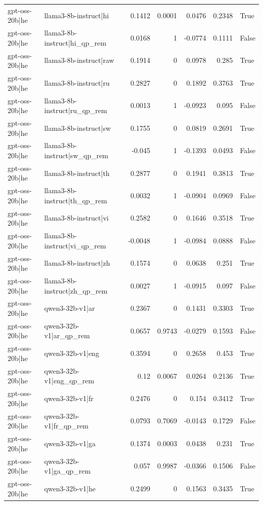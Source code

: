 \begin{table}
\begin{tabular}{l l r r r r l}
gpt-oss-20b|he & llama3-8b-instruct|hi & 0.1412 & 0.0001 & 0.0476 & 0.2348 & True \\
gpt-oss-20b|he & llama3-8b-instruct|hi_qp_rem & 0.0168 & 1 & -0.0774 & 0.1111 & False \\
gpt-oss-20b|he & llama3-8b-instruct|raw & 0.1914 & 0 & 0.0978 & 0.285 & True \\
gpt-oss-20b|he & llama3-8b-instruct|ru & 0.2827 & 0 & 0.1892 & 0.3763 & True \\
gpt-oss-20b|he & llama3-8b-instruct|ru_qp_rem & 0.0013 & 1 & -0.0923 & 0.095 & False \\
gpt-oss-20b|he & llama3-8b-instruct|sw & 0.1755 & 0 & 0.0819 & 0.2691 & True \\
gpt-oss-20b|he & llama3-8b-instruct|sw_qp_rem & -0.045 & 1 & -0.1393 & 0.0493 & False \\
gpt-oss-20b|he & llama3-8b-instruct|th & 0.2877 & 0 & 0.1941 & 0.3813 & True \\
gpt-oss-20b|he & llama3-8b-instruct|th_qp_rem & 0.0032 & 1 & -0.0904 & 0.0969 & False \\
gpt-oss-20b|he & llama3-8b-instruct|vi & 0.2582 & 0 & 0.1646 & 0.3518 & True \\
gpt-oss-20b|he & llama3-8b-instruct|vi_qp_rem & -0.0048 & 1 & -0.0984 & 0.0888 & False \\
gpt-oss-20b|he & llama3-8b-instruct|zh & 0.1574 & 0 & 0.0638 & 0.251 & True \\
gpt-oss-20b|he & llama3-8b-instruct|zh_qp_rem & 0.0027 & 1 & -0.0915 & 0.097 & False \\
gpt-oss-20b|he & qwen3-32b-v1|ar & 0.2367 & 0 & 0.1431 & 0.3303 & True \\
gpt-oss-20b|he & qwen3-32b-v1|ar_qp_rem & 0.0657 & 0.9743 & -0.0279 & 0.1593 & False \\
gpt-oss-20b|he & qwen3-32b-v1|eng & 0.3594 & 0 & 0.2658 & 0.453 & True \\
gpt-oss-20b|he & qwen3-32b-v1|eng_qp_rem & 0.12 & 0.0067 & 0.0264 & 0.2136 & True \\
gpt-oss-20b|he & qwen3-32b-v1|fr & 0.2476 & 0 & 0.154 & 0.3412 & True \\
gpt-oss-20b|he & qwen3-32b-v1|fr_qp_rem & 0.0793 & 0.7069 & -0.0143 & 0.1729 & False \\
gpt-oss-20b|he & qwen3-32b-v1|ga & 0.1374 & 0.0003 & 0.0438 & 0.231 & True \\
gpt-oss-20b|he & qwen3-32b-v1|ga_qp_rem & 0.057 & 0.9987 & -0.0366 & 0.1506 & False \\
gpt-oss-20b|he & qwen3-32b-v1|he & 0.2499 & 0 & 0.1563 & 0.3435 & True \\

\end{tabular}
\end{table}
